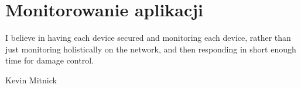 \chapter[Monitorowania aplikacji]{Monitorowanie aplikacji}
\label{chapter:monitoring}

\epigraph{
    I believe in having each device secured and monitoring each device, rather than just
    monitoring holistically on the network, and then responding in short enough time for damage control.
    }{Kevin Mitnick}





